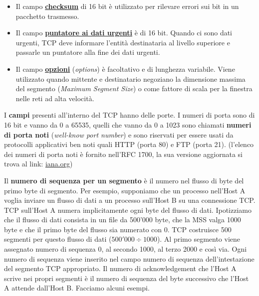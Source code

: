 \documentclass[a4paper]{article}
\begin{document}
\begin{itemize}
		\item Il campo \textbf{\underline{checksum}} di 16 bit è utilizzato per rilevare errori sui bit in un pacchetto trasmesso.
		
		\item Il campo \textbf{\underline{puntatore ai dati urgenti}} è di 16 bit. Quando ci sono dati urgenti, TCP deve informare l’entità destinataria al livello superiore e passarle un puntatore alla fine dei dati urgenti.
		
		\item Il campo \textbf{\underline{opzioni}} (\emph{options}) è facoltativo e di lunghezza variabile. Viene utilizzato quando mittente e destinatario negoziano la dimensione massima del segmento (\emph{Maximum Segment Size}) o come fattore di scala per la finestra nelle reti ad alta velocità.
	\end{itemize}
	\newline
	
	\noindent
	I \textbf{campi} presenti all’interno del TCP hanno delle porte. I numeri di porta sono di 16 bit e vanno da 0 a 65535, quelli che vanno da 0 a 1023 sono chiamati \textbf{numeri di porta noti} (\emph{well-know port number}) e sono riservati per essere usati da protocolli applicativi ben noti quali HTTP (porta 80) e FTP (porta 21). (l’elenco dei numeri di porta noti è fornito nell’RFC 1700, la sua versione aggiornata si trova al link: \href{http://www.iana.org}{iana.org})
	
	\newpage
	
	\noindent
	Il \textbf{numero di sequenza per un segmento} è il numero nel flusso di byte del primo byte di segmento. Per esempio, supponiamo che un processo nell’Host A voglia inviare un flusso di dati a un processo sull’Host B su una connessione TCP. TCP sull’Host A numera implicitamente ogni byte del flusso di dati. Ipotizziamo che il flusso di dati consista in un file da 500'000 byte, che la MSS valga 1000 byte e che il primo byte del flusso sia numerato con 0. TCP costruisce 500 segmenti per questo flusso di dati ($500'000 \div 1000$). Al primo segmento viene assegnato numero di sequenza 0, al secondo 1000, al terzo 2000 e così via. Ogni numero di sequenza viene inserito nel campo numero di sequenza dell’intestazione del segmento TCP appropriato. Il numero di acknowledgement che l’Host A scrive nei propri segmenti è il numero di sequenza del byte successivo che l’Host A attende dall’Host B. Facciamo alcuni esempi.\newline
	
\end{document}
